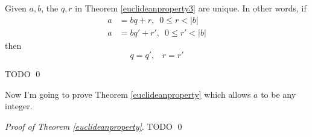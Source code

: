 


\begin{prop}
  Given $a,b$, the $q,r$ in
  Theorem \ref{euclideanproperty3}
  are unique.
  In other words,
  if
  \begin{align*}
    a &= bq+r, \,\,\, 0 \leq r < |b| \\
    a &= bq'+r', \,\,\, 0 \leq r' < |b|
  \end{align*}
  then
  \[
  q=q', \,\,\,\,\, r=r'
  \]
\end{prop}

\proof
TODO
\qed

Now I'm going to prove Theorem \ref{euclideanproperty}
which allows $a$ to be any integer.

\textit{Proof of Theorem \ref{euclideanproperty}}.
TODO
\qed









